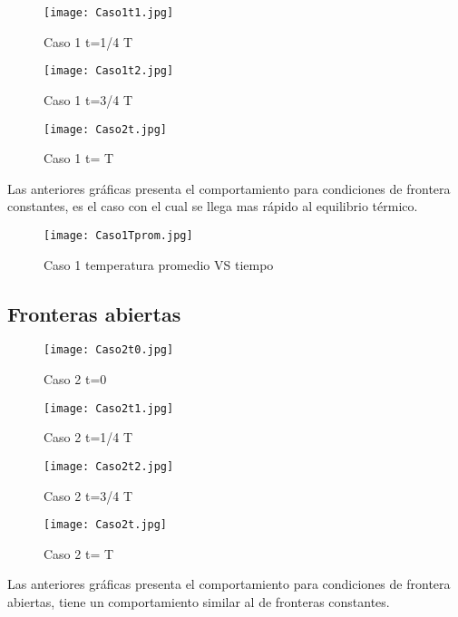 \documentclass{article}
\begin{document}
\begin{figure}[h!]
\centering
\texttt{[image: Caso1t1.jpg]}
\caption{Caso 1 t=1/4 T}
\label{fig:2}
\end{figure}

\begin{figure}[h!]
\centering
\texttt{[image: Caso1t2.jpg]}
\caption{Caso 1 t=3/4 T}
\label{fig:3}
\end{figure}

\begin{figure}[h!]
\centering
\texttt{[image: Caso2t.jpg]}
\caption{Caso 1 t= T}
\label{fig:4}
\end{figure}

Las anteriores gráficas presenta el comportamiento para condiciones de frontera constantes, es el caso con el cual se llega mas rápido al equilibrio térmico.\\

\begin{figure}[h!]
\centering
\texttt{[image: Caso1Tprom.jpg]}
\caption{Caso 1 temperatura promedio VS tiempo}
\label{fig:13}
\end{figure}

\clearpage


\subsection{Fronteras abiertas}

\begin{figure}[h!]
\centering
\texttt{[image: Caso2t0.jpg]}
\caption{Caso 2 t=0}
\label{fig:5}
\end{figure}

\begin{figure}[h!]
\centering
\texttt{[image: Caso2t1.jpg]}
\caption{Caso 2 t=1/4 T}
\label{fig:6}
\end{figure}

\begin{figure}[h!]
\centering
\texttt{[image: Caso2t2.jpg]}
\caption{Caso 2 t=3/4 T}
\label{fig:7}
\end{figure}

\begin{figure}[h!]
\centering
\texttt{[image: Caso2t.jpg]}
\caption{Caso 2 t= T}
\label{fig:8}
\end{figure}

Las anteriores gráficas presenta el comportamiento para condiciones de frontera abiertas, tiene un comportamiento similar al de fronteras constantes.\\
\end{document}
